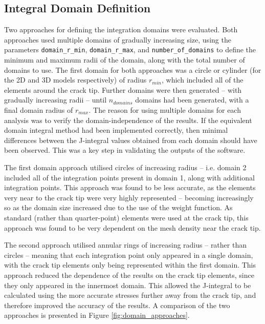 \subsection{Integral Domain Definition}\label{sec:implementation_domains}

Two approaches for defining the integration domains were evaluated. Both approaches used multiple domains of gradually increasing size, using the parameters \texttt{domain\_r\_min}, \texttt{domain\_r\_max}, and \texttt{number\_of\_domains} to define the minimum and maximum radii of the domain, along with the total number of domains to use. The first domain for both approaches was a circle or cylinder (for the 2D and 3D models respectively) of radius $r_{min}$, which included all of the elements around the crack tip. Further domains were then generated -- with gradually increasing radii -- until $n_{domains}$ domains had been generated, with a final domain radius of $r_{max}$. The reason for using multiple domains for each analysis was to verify the domain-independence of the results. If the equivalent domain integral method had been implemented correctly, then minimal differences between the J-integral values obtained from each domain should have been observed. This was a key step in validating the outputs of the software.

The first domain approach utilised circles of increasing radius -- i.e. domain 2 included all of the integration points present in domain 1, along with additional integration points. This approach was found to be less accurate, as the elements very near to the crack tip were very highly represented -- becoming increasingly so as the domain size increased due to the use of the weight function. As standard (rather than quarter-point) elements were used at the crack tip, this approach was found to be very dependent on the mesh density near the crack tip.

The second approach utilised annular rings of increasing radius -- rather than circles -- meaning that each integration point only appeared in a single domain, with the crack tip elements only being represented within the first domain. This approach reduced the dependence of the results on the crack tip elements, since they only appeared in the innermost domain. This allowed the J-integral to be calculated using the more accurate stresses further away from the crack tip, and therefore improved the accuracy of the results. A comparison of the two approaches is presented in Figure \ref{fig:domain_approaches}.

